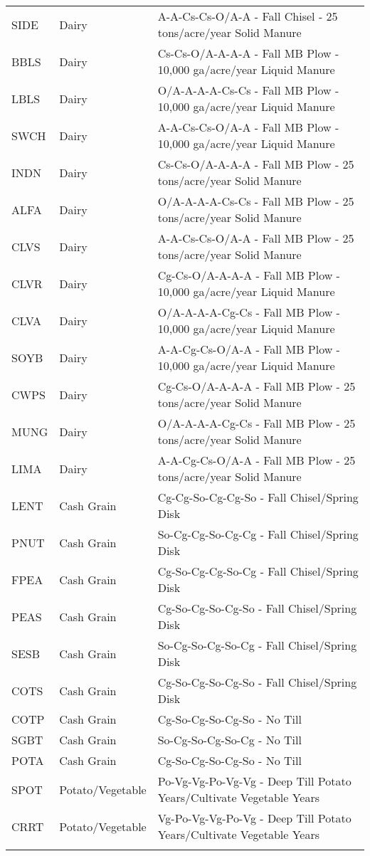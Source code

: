 \begin{landscape}
\begin{longtable}{lll}
  SIDE & Dairy & A-A-Cs-Cs-O/A-A - Fall Chisel - 25 tons/acre/year Solid Manure  \\ 
  BBLS & Dairy & Cs-Cs-O/A-A-A-A - Fall MB Plow - 10,000 ga/acre/year Liquid Manure  \\ 
  LBLS & Dairy & O/A-A-A-A-Cs-Cs - Fall MB Plow - 10,000 ga/acre/year Liquid Manure  \\ 
  SWCH & Dairy & A-A-Cs-Cs-O/A-A - Fall MB Plow - 10,000 ga/acre/year Liquid Manure  \\ 
  INDN & Dairy & Cs-Cs-O/A-A-A-A - Fall MB Plow - 25 tons/acre/year Solid Manure  \\ 
  ALFA & Dairy & O/A-A-A-A-Cs-Cs - Fall MB Plow - 25 tons/acre/year Solid Manure  \\ 
  CLVS & Dairy & A-A-Cs-Cs-O/A-A - Fall MB Plow - 25 tons/acre/year Solid Manure  \\ 
  CLVR & Dairy & Cg-Cs-O/A-A-A-A - Fall MB Plow - 10,000 ga/acre/year Liquid Manure  \\ 
  CLVA & Dairy & O/A-A-A-A-Cg-Cs - Fall MB Plow - 10,000 ga/acre/year Liquid Manure  \\ 
  SOYB & Dairy & A-A-Cg-Cs-O/A-A - Fall MB Plow - 10,000 ga/acre/year Liquid Manure  \\ 
  CWPS & Dairy & Cg-Cs-O/A-A-A-A - Fall MB Plow - 25 tons/acre/year Solid Manure  \\ 
  MUNG & Dairy & O/A-A-A-A-Cg-Cs - Fall MB Plow - 25 tons/acre/year Solid Manure  \\ 
  LIMA & Dairy & A-A-Cg-Cs-O/A-A - Fall MB Plow - 25 tons/acre/year Solid Manure  \\ 
  LENT & Cash Grain & Cg-Cg-So-Cg-Cg-So - Fall Chisel/Spring Disk  \\ 
  PNUT & Cash Grain & So-Cg-Cg-So-Cg-Cg - Fall Chisel/Spring Disk  \\ 
  FPEA & Cash Grain & Cg-So-Cg-Cg-So-Cg - Fall Chisel/Spring Disk  \\ 
  PEAS & Cash Grain & Cg-So-Cg-So-Cg-So - Fall Chisel/Spring Disk  \\ 
  SESB & Cash Grain & So-Cg-So-Cg-So-Cg - Fall Chisel/Spring Disk  \\ 
  COTS & Cash Grain & Cg-So-Cg-So-Cg-So - Fall Chisel/Spring Disk  \\ 
  COTP & Cash Grain & Cg-So-Cg-So-Cg-So - No Till  \\ 
  SGBT & Cash Grain & So-Cg-So-Cg-So-Cg - No Till  \\ 
  POTA & Cash Grain & Cg-So-Cg-So-Cg-So - No Till  \\ 
  SPOT & Potato/Vegetable & Po-Vg-Vg-Po-Vg-Vg - Deep Till Potato Years/Cultivate Vegetable Years  \\ 
  CRRT & Potato/Vegetable & Vg-Po-Vg-Vg-Po-Vg - Deep Till Potato Years/Cultivate Vegetable Years  \\ 
\label{tab:lnd_mgt_def}
\end{longtable}
\end{landscape}